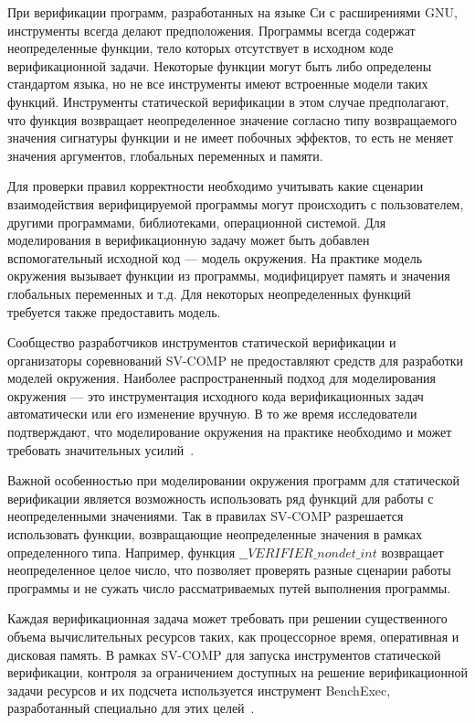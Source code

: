 \documentclass[%
candidate,     %
href,        %
colorlinks,  %
]{disser}
\begin{document}
При верификации программ, разработанных на языке Си с расширениями GNU, инструменты всегда делают предположения.
Программы всегда содержат неопределенные функции, тело которых отсутствует в исходном коде верификационной задачи.
Некоторые функции могут быть либо определены стандартом языка, но не все инструменты имеют встроенные модели таких функций.
Инструменты статической верификации в этом случае предполагают, что функция возвращает неопределенное значение согласно типу возвращаемого значения сигнатуры функции и не имеет побочных эффектов, то есть не меняет значения аргументов, глобальных переменных и памяти.

Для проверки правил корректности необходимо учитывать какие сценарии взаимодействия верифицируемой программы могут происходить с пользователем, другими программами, библиотеками, операционной системой.
Для моделирования в верификационную задачу может быть добавлен вспомогательный исходной код --- модель окружения.
На практике модель окружения вызывает функции из программы, модифицирует память и значения глобальных переменных и т.д.
Для некоторых неопределенных функций требуется также предоставить модель.

Сообщество разработчиков инструментов статической верификации и организаторы соревнований \mbox{SV-COMP} не предоставляют средств для разработки моделей окружения.
Наиболее распространенный подход для моделирования окружения --- это инструментация исходного кода верификационных задач автоматически или его изменение вручную.
В то же время исследователи подтверждают, что моделирование окружения на практике необходимо и может требовать значительных усилий~\cite{subsystems:Trudy, ZakharovEnv2015, ModelingLargeSystems, neville2016a, FlashDriver, ConcurBugsRakamaric, Ivancic:2015:SSS}.

Важной особенностью при моделировании окружения программ для статической верификации является возможность использовать ряд функций для работы с неопределенными значениями.
Так в правилах \mbox{SV-COMP} разрешается использовать функции, возвращающие неопределенные значения в рамках определенного типа.
Например, функция $\_\_VERIFIER\_nondet\_int$ возвращает неопределенное целое число, что позволяет проверять разные сценарии работы программы и не сужать число рассматриваемых путей выполнения программы.

Каждая верификационная задача может требовать при решении существенного объема вычислительных ресурсов таких, как процессорное время, оперативная и дисковая память. 
В рамках \mbox{SV-COMP} для запуска инструментов статической верификации, контроля за ограничением доступных на решение верификационной задачи ресурсов и их подсчета используется инструмент \mbox{BenchExec}, разработанный специально для этих целей~\cite{Beyer2015}.
\end{document}
